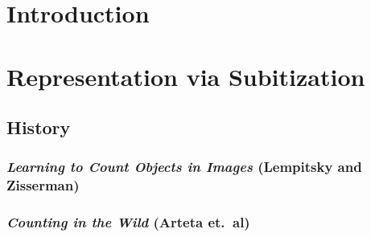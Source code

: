 \documentclass[showabstract,showacknowledgments,showpreface,showdedication]{iuphd}
\begin{document}

\begin{abstract}

\end{abstract}

\newpage


\tableofcontents



\chapter{Introduction}



\chapter{Representation via Subitization}

\section{History}

\subsection{\textit{Learning to Count Objects in Images} (Lempitsky and Zisserman)}

\subsection{\textit{Counting in the Wild} (Arteta et.\ al)}

\end{document}
